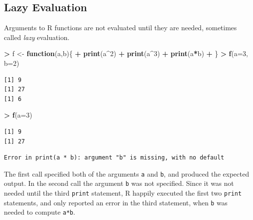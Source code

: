 \documentclass[
]{krantz}
\makeatletter
\newenvironment{Shaded}{\begin{snugshade}}{\end{snugshade}}
\newcommand{\ControlFlowTok}[1]{\textcolor[rgb]{0.27,0.27,0.27}{\textbf{#1}}}
\newcommand{\DataTypeTok}[1]{\textcolor[rgb]{0.27,0.27,0.27}{#1}}
\newcommand{\DecValTok}[1]{\textcolor[rgb]{0.06,0.06,0.06}{#1}}
\newcommand{\KeywordTok}[1]{\textcolor[rgb]{0.27,0.27,0.27}{\textbf{#1}}}
\newcommand{\NormalTok}[1]{#1}
\newcommand{\OperatorTok}[1]{\textcolor[rgb]{0.43,0.43,0.43}{\textbf{#1}}}
\newcommand{\StringTok}[1]{\textcolor[rgb]{0.5,0.5,0.5}{#1}}
\newenvironment{kframe}{%
\medskip{}
\setlength{\fboxsep}{.8em}
 \def\at@end@of@kframe{}%
 \ifinner\ifhmode%
  \def\at@end@of@kframe{\end{minipage}}%
  \begin{minipage}{\columnwidth}%
 \fi\fi%
 \def\FrameCommand##1{\hskip\@totalleftmargin \hskip-\fboxsep
 \colorbox{shadecolor}{##1}\hskip-\fboxsep
     \hskip-\linewidth \hskip-\@totalleftmargin \hskip\columnwidth}%
 \MakeFramed {\advance\hsize-\width
   \@totalleftmargin\z@ \linewidth\hsize
   \@setminipage}}%
 {\par\unskip\endMakeFramed%
 \at@end@of@kframe}
\renewenvironment{Shaded}{\begin{kframe}}{\end{kframe}}
\makeatother
\begin{document}
\hypertarget{lazy-evaluation}{%
\subsection{Lazy Evaluation}\label{lazy-evaluation}}

Arguments to R functions are not evaluated until they are needed, sometimes called \emph{lazy} evaluation.

\begin{Shaded}
\begin{Highlighting}[]
\OperatorTok{\textgreater{}}\StringTok{ }\NormalTok{f \textless{}{-}}\StringTok{ }\ControlFlowTok{function}\NormalTok{(a,b)\{}
\OperatorTok{+}\StringTok{     }\KeywordTok{print}\NormalTok{(a}\OperatorTok{\^{}}\DecValTok{2}\NormalTok{)}
\OperatorTok{+}\StringTok{     }\KeywordTok{print}\NormalTok{(a}\OperatorTok{\^{}}\DecValTok{3}\NormalTok{)}
\OperatorTok{+}\StringTok{     }\KeywordTok{print}\NormalTok{(a}\OperatorTok{*}\NormalTok{b)}
\OperatorTok{+}\StringTok{ }\NormalTok{\}}
\OperatorTok{\textgreater{}}\StringTok{ }\KeywordTok{f}\NormalTok{(}\DataTypeTok{a=}\DecValTok{3}\NormalTok{, }\DataTypeTok{b=}\DecValTok{2}\NormalTok{)}
\end{Highlighting}
\end{Shaded}

\begin{verbatim}
[1] 9
[1] 27
[1] 6
\end{verbatim}

\begin{Shaded}
\begin{Highlighting}[]
\OperatorTok{\textgreater{}}\StringTok{ }\KeywordTok{f}\NormalTok{(}\DataTypeTok{a=}\DecValTok{3}\NormalTok{)}
\end{Highlighting}
\end{Shaded}

\begin{verbatim}
[1] 9
[1] 27
\end{verbatim}

\begin{verbatim}
Error in print(a * b): argument "b" is missing, with no default
\end{verbatim}

The first call specified both of the arguments \texttt{a} and \texttt{b}, and produced the expected output. In the second call the argument \texttt{b} was not specified. Since it was not needed until the third \texttt{print} statement, R happily executed the first two \texttt{print} statements, and only reported an error in the third statement, when \texttt{b} was needed to compute \texttt{a*b}.
\end{document}
